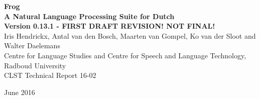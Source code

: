 \documentclass{book}
\begin{document}

\begin{titlepage}
	\begin{center}


        \vspace{115pt}
        \textbf{\huge{Frog}
        \ \\
        \vspace{30pt}
        \Large{A Natural Language Processing Suite for Dutch
}}\\ %
        \vspace{95pt}
        \textbf{\Large{Version 0.13.1 - FIRST DRAFT REVISION! NOT FINAL!}}\\  %
		\vspace{3,5cm}
        Iris Hendrickx, Antal van den Bosch, Maarten van Gompel, Ko van der Sloot and Walter Daelemans\\ %
       Centre for Language Studies and Centre for Speech and Language Technology, Radboud University\\
       CLST Technical Report 16-02\\

	\end{center}

	\vspace{1cm}

	\begin{center}
		\vspace{\fill}
         June 2016
    \end{center}
\end{titlepage}
\tableofcontents
\thispagestyle{empty}

\newpage
{}


\end{document}

